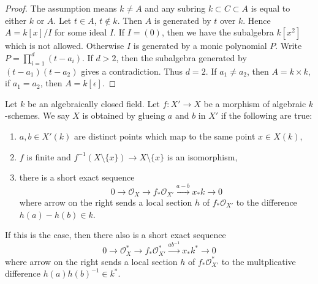 \begin{proof}
The assumption means $k \not = A$ and any subring $k \subset C \subset A$
is equal to either $k$ or $A$. Let $t \in A$, $t \not \in k$.
Then $A$ is generated by $t$ over $k$. Hence $A = k[x]/I$ for some
ideal $I$. If $I = (0)$, then we have the subalgebra $k[x^2]$
which is not allowed. Otherwise $I$ is generated by a monic polynomial $P$.
Write $P = \prod_{i = 1}^d (t - a_i)$. If $d > 2$, then the subalgebra
generated by $(t - a_1)(t - a_2)$ gives a contradiction.
Thus $d = 2$. If $a_1 \not = a_2$, then $A = k \times k$,
if $a_1 = a_2$, then $A = k[\epsilon]$.
\end{proof}

\begin{example}
\label{example-glue-points}
Let $k$ be an algebraically closed field. Let $f : X' \to X$
be a morphism of algebraic $k$-schemes. We say $X$ is
obtained by glueing $a$ and $b$ in $X'$ if the following are true:
\begin{enumerate}
\item $a, b \in X'(k)$ are distinct points which map to the same
point $x \in X(k)$,
\item $f$ is finite and
$f^{-1}(X \setminus \{x\}) \to X \setminus \{x\}$ is an isomorphism,
\item there is a short exact sequence
$$
0 \to \mathcal{O}_X \to f_*\mathcal{O}_{X'} \xrightarrow{a - b} x_*k \to 0
$$
where arrow on the right sends a local section $h$ of $f_*\mathcal{O}_{X'}$
to the difference $h(a) - h(b) \in k$.
\end{enumerate}
If this is the case, then there also is a short exact sequence
$$
0 \to \mathcal{O}_X^* \to f_*\mathcal{O}_{X'}^*
\xrightarrow{ab^{-1}} x_*k^* \to 0
$$
where arrow on the right sends a local section $h$ of $f_*\mathcal{O}_{X'}^*$
to the multplicative difference $h(a)h(b)^{-1} \in k^*$.
\end{example}

